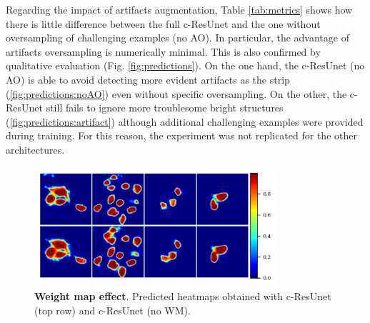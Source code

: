 Regarding the impact of artifacts augmentation, Table \ref{tab:metrics} shows how there is little difference between the full c-ResUnet and the one without oversampling of challenging examples (no AO).
In particular, the advantage of artifacts oversampling is numerically minimal.
This is also confirmed by qualitative evaluation (Fig. \ref{fig:predictions}).
On the one hand, the c-ResUnet (no AO) is able to avoid detecting more evident artifacts as the strip (\ref{fig:predictions:noAO}) even without specific oversampling.
On the other, the c-ResUnet  still fails to ignore more troublesome bright structures (\ref{fig:predictions:artifact}) although additional challenging examples were provided during training.
For this reason, the experiment was not replicated for the other architectures. 
\begin{figure}
\centerline{\includegraphics[width=0.8\textwidth]{figures/130_methods/weigths_effect.png}}
\caption{\textbf{Weight map effect}. 
Predicted heatmaps obtained with c-ResUnet (top row) and c-ResUnet (no WM).} 
\label{fig:weigths_effect}
\end{figure}
